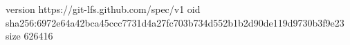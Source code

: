 version https://git-lfs.github.com/spec/v1
oid sha256:6972e64a42bca45ccc7731d4a27fc703b734d552b1b2d90de119d9730b3f9e23
size 626416
